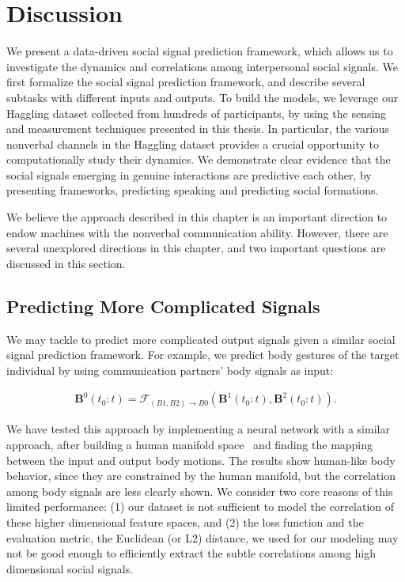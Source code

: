 
\section{Discussion}

We present a data-driven social signal prediction framework, which allows us to investigate the dynamics and correlations among interpersonal social signals. We first formalize the social signal prediction framework, and describe several subtasks with different inputs and outputs. To build the models, we leverage our Haggling dataset collected from hundreds of participants, by using the sensing and measurement techniques presented in this thesis. In particular, the various nonverbal channels in the Haggling dataset provides a crucial opportunity to computationally study their dynamics. We demonstrate clear evidence that the social signals emerging in genuine interactions are predictive each other, by presenting frameworks, predicting speaking and predicting social formations.

We believe the approach described in this chapter is an important direction to endow machines with the nonverbal communication ability. However, there are several unexplored directions in this chapter, and two important questions are discussed in this section. 

\subsection{Predicting More Complicated Signals}
We may tackle to predict more complicated output signals given a similar social signal prediction framework. For example, we predict body gestures of the target individual by using communication partners' body signals as input:

\begin{gather}	
\mathbf{B}^0 (t_0:t) = \mathcal{F}_{(B1,B2)\rightarrow B0} \left( \mathbf{B}^1 (t_0:t), \mathbf{B}^2 (t_0:t) \right) .
\end{gather}

We have tested this approach by implementing a neural network with a similar approach, after building a human manifold space~\cite{holden2016deep} and finding the mapping between the input and output body motions. The results show human-like body behavior, since they are constrained by the human manifold, but the correlation among body signals are less clearly shown. We consider two core reasons of this limited performance: (1) our dataset is not sufficient to model the correlation of these higher dimensional feature spaces, and (2) the loss function and the evaluation metric, the Euclidean (or L2) distance, we used for our modeling may not be good enough to efficiently extract the subtle correlations among high dimensional social signals.

